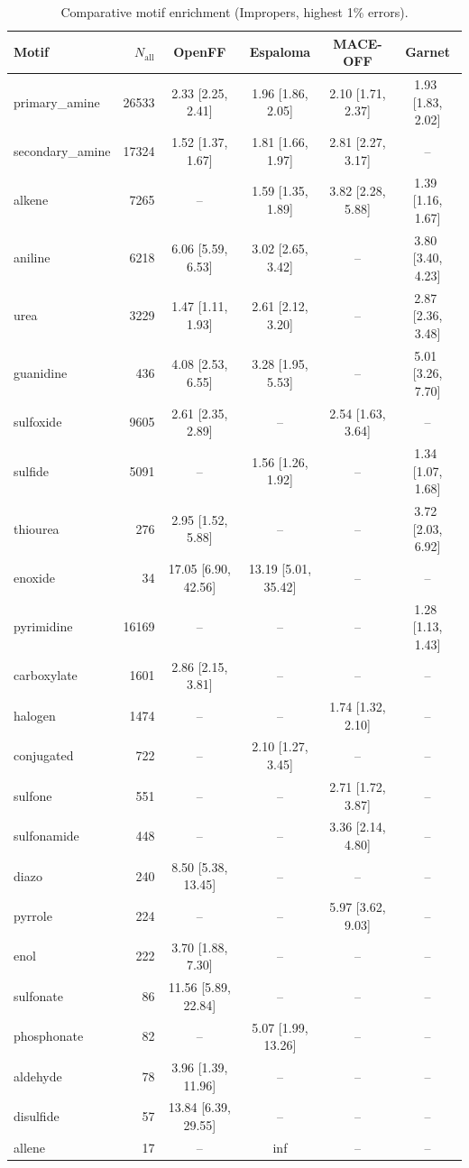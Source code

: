 \begin{table}[h!]
  \centering
  \small
  \setlength{\tabcolsep}{5pt}
  \renewcommand{\arraystretch}{1.15}
  \begin{tabular}{l r c c c c}
    \hline
    Motif & $N_\mathrm{all}$ & OpenFF & Espaloma & MACE-OFF & Garnet \\
    \hline
    primary\_amine & 26533 & 2.33\,\,[2.25, 2.41] & 1.96\,\,[1.86, 2.05] & 2.10\,\,[1.71, 2.37] & 1.93\,\,[1.83, 2.02] \\
    \hdashline
    secondary\_amine & 17324 & 1.52\,\,[1.37, 1.67] & 1.81\,\,[1.66, 1.97] & 2.81\,\,[2.27, 3.17] & -- \\
    alkene & 7265 & -- & 1.59\,\,[1.35, 1.89] & 3.82\,\,[2.28, 5.88] & 1.39\,\,[1.16, 1.67] \\
    aniline & 6218 & 6.06\,\,[5.59, 6.53] & 3.02\,\,[2.65, 3.42] & -- & 3.80\,\,[3.40, 4.23] \\
    urea & 3229 & 1.47\,\,[1.11, 1.93] & 2.61\,\,[2.12, 3.20] & -- & 2.87\,\,[2.36, 3.48] \\
    guanidine & 436 & 4.08\,\,[2.53, 6.55] & 3.28\,\,[1.95, 5.53] & -- & 5.01\,\,[3.26, 7.70] \\
    \hdashline
    sulfoxide & 9605 & 2.61\,\,[2.35, 2.89] & -- & 2.54\,\,[1.63, 3.64] & -- \\
    sulfide & 5091 & -- & 1.56\,\,[1.26, 1.92] & -- & 1.34\,\,[1.07, 1.68] \\
    thiourea & 276 & 2.95\,\,[1.52, 5.88] & -- & -- & 3.72\,\,[2.03, 6.92] \\
    enoxide & 34 & 17.05\,\,[6.90, 42.56] & 13.19\,\,[5.01, 35.42] & -- & -- \\
    \hdashline
    pyrimidine & 16169 & -- & -- & -- & 1.28\,\,[1.13, 1.43] \\
    carboxylate & 1601 & 2.86\,\,[2.15, 3.81] & -- & -- & -- \\
    halogen & 1474 & -- & -- & 1.74\,\,[1.32, 2.10] & -- \\
    conjugated & 722 & -- & 2.10\,\,[1.27, 3.45] & -- & -- \\
    sulfone & 551 & -- & -- & 2.71\,\,[1.72, 3.87] & -- \\
    sulfonamide & 448 & -- & -- & 3.36\,\,[2.14, 4.80] & -- \\
    diazo & 240 & 8.50\,\,[5.38, 13.45] & -- & -- & -- \\
    pyrrole & 224 & -- & -- & 5.97\,\,[3.62, 9.03] & -- \\
    enol & 222 & 3.70\,\,[1.88, 7.30] & -- & -- & -- \\
    sulfonate & 86 & 11.56\,\,[5.89, 22.84] & -- & -- & -- \\
    phosphonate & 82 & -- & 5.07\,\,[1.99, 13.26] & -- & -- \\
    aldehyde & 78 & 3.96\,\,[1.39, 11.96] & -- & -- & -- \\
    disulfide & 57 & 13.84\,\,[6.39, 29.55] & -- & -- & -- \\
    allene & 17 & -- & inf & -- & -- \\
    \hline
  \end{tabular}
  \caption{Comparative motif enrichment (Impropers, highest 1\% errors).}
  \label{tab:compare_impropers_worst}
\end{table}